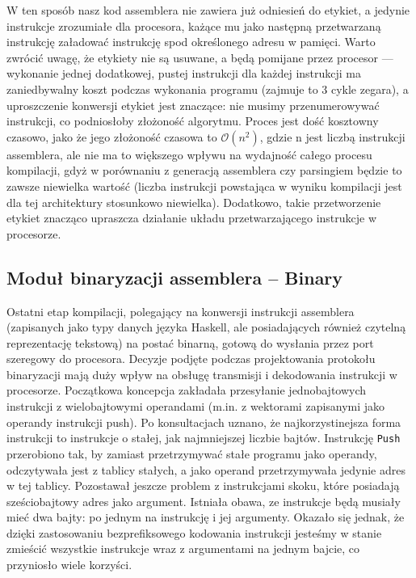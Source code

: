 W ten sposób nasz kod assemblera nie zawiera już odniesień do etykiet, a jedynie instrukcje zrozumiałe dla procesora, każące mu jako następną przetwarzaną instrukcję załadować instrukcję spod określonego adresu w pamięci. Warto zwrócić uwagę, że etykiety nie są usuwane, a będą pomijane przez procesor --- wykonanie jednej dodatkowej, pustej instrukcji dla każdej instrukcji ma zaniedbywalny koszt podczas wykonania programu (zajmuje to 3 cykle zegara), a uproszczenie konwersji etykiet jest znaczące: nie musimy przenumerowywać instrukcji, co podniosłoby złożoność algorytmu. Proces jest dość kosztowny czasowo, jako że jego złożoność czasowa to $\mathcal{O}(n^2)$, gdzie n jest liczbą instrukcji assemblera, ale nie ma to większego wpływu na wydajność całego procesu kompilacji, gdyż w porównaniu z generacją assemblera czy parsingiem będzie to zawsze niewielka wartość (liczba instrukcji powstająca w wyniku kompilacji jest dla tej architektury stosunkowo niewielka). Dodatkowo, takie przetworzenie etykiet znacząco upraszcza działanie układu przetwarzającego instrukcje w procesorze.


\subsection{Moduł binaryzacji assemblera -- Binary}

Ostatni etap kompilacji, polegający na konwersji instrukcji assemblera (zapisanych jako typy danych języka Haskell, ale posiadających również czytelną reprezentację tekstową) na postać binarną, gotową do wysłania przez port szeregowy do procesora. Decyzje podjęte podczas projektowania protokołu binaryzacji mają duży wpływ na obsługę transmisji i dekodowania instrukcji w procesorze. Początkowa koncepcja zakładała przesyłanie jednobajtowych instrukcji z wielobajtowymi operandami (m.in. z wektorami zapisanymi jako operandy instrukcji push). Po konsultacjach uznano, że najkorzystinejsza forma instrukcji to instrukcje o stałej, jak najmniejszej liczbie bajtów. Instrukcję \texttt{Push} przerobiono tak, by zamiast przetrzymywać stałe programu jako operandy, odczytywała jest z tablicy stałych, a jako operand przetrzymywała jedynie adres w tej tablicy. Pozostawał jeszcze problem z instrukcjami skoku, które posiadają sześciobajtowy adres jako argument. Istniała obawa, ze instrukcje będą musiały mieć dwa bajty: po jednym na instrukcję i jej argumenty. Okazało się jednak, że dzięki zastosowaniu bezprefiksowego kodowania instrukcji jesteśmy w stanie zmieścić wszystkie instrukcje wraz z argumentami na jednym bajcie, co przyniosło wiele korzyści.


